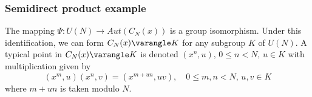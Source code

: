 \subsubsection{Semidirect product example}
The mapping $\Psi: U(N) \to Aut(C_N(x))$ is a group
isomorphism.
Under this identification, we can form $C_N(x)\varangle K$
for any subgroup $K$ of $U(N)$.  A typical point in 
$C_N(x)\varangle K$ is denoted 
$(x^n, u), \, 0\leq n<N,\, u\in K$ with multiplication given
by  
\[
(x^m, u)(x^n, v) = (x^{m+un},uv), \quad 
0\leq m, n < N,\, u, v \in K
\]
where $m+un$ is taken modulo $N$.

